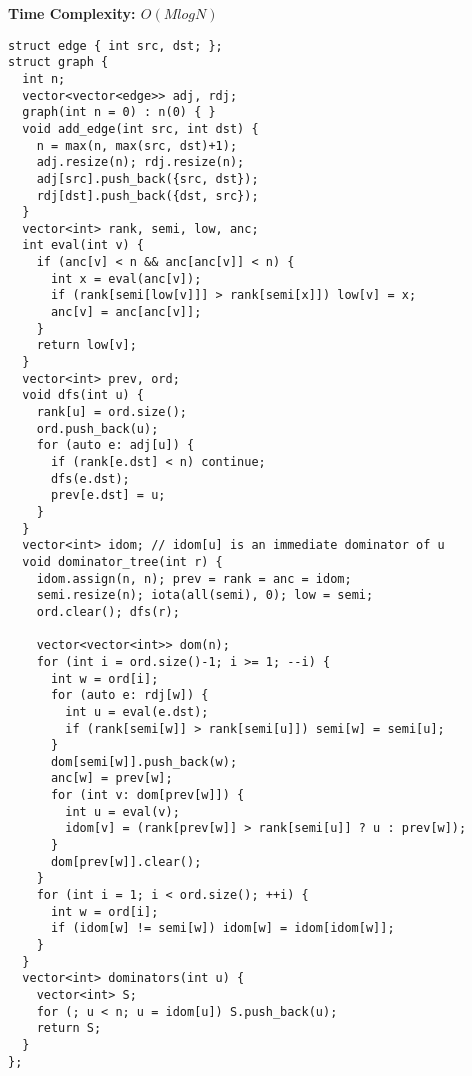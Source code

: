 \textbf{Time Complexity: $O(M log N)$}\\
\begin{lstlisting}
struct edge { int src, dst; };
struct graph {
  int n;
  vector<vector<edge>> adj, rdj;
  graph(int n = 0) : n(0) { } 
  void add_edge(int src, int dst) {
    n = max(n, max(src, dst)+1);
    adj.resize(n); rdj.resize(n);
    adj[src].push_back({src, dst});
    rdj[dst].push_back({dst, src});
  }
  vector<int> rank, semi, low, anc;
  int eval(int v) { 
    if (anc[v] < n && anc[anc[v]] < n) {
      int x = eval(anc[v]);
      if (rank[semi[low[v]]] > rank[semi[x]]) low[v] = x;
      anc[v] = anc[anc[v]];
    }
    return low[v];
  }
  vector<int> prev, ord;
  void dfs(int u) {
    rank[u] = ord.size();
    ord.push_back(u);
    for (auto e: adj[u]) {
      if (rank[e.dst] < n) continue;
      dfs(e.dst);
      prev[e.dst] = u;
    }
  }
  vector<int> idom; // idom[u] is an immediate dominator of u
  void dominator_tree(int r) {
    idom.assign(n, n); prev = rank = anc = idom;
    semi.resize(n); iota(all(semi), 0); low = semi;
    ord.clear(); dfs(r);

    vector<vector<int>> dom(n);
    for (int i = ord.size()-1; i >= 1; --i) {
      int w = ord[i];
      for (auto e: rdj[w]) {
        int u = eval(e.dst);
        if (rank[semi[w]] > rank[semi[u]]) semi[w] = semi[u];
      }
      dom[semi[w]].push_back(w);
      anc[w] = prev[w];
      for (int v: dom[prev[w]]) {
        int u = eval(v);
        idom[v] = (rank[prev[w]] > rank[semi[u]] ? u : prev[w]);
      }
      dom[prev[w]].clear();
    }
    for (int i = 1; i < ord.size(); ++i) {
      int w = ord[i];
      if (idom[w] != semi[w]) idom[w] = idom[idom[w]];
    }
  }
  vector<int> dominators(int u) {
    vector<int> S;
    for (; u < n; u = idom[u]) S.push_back(u);
    return S;
  }
};
\end{lstlisting}